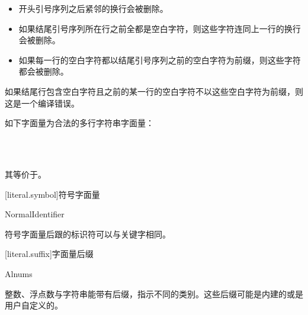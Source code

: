 \begin{itemize}
    \item 开头引号序列之后紧邻的换行会被删除。
    \item 如果结尾引号序列所在行之前全都是空白字符，则这些字符连同上一行的换行会被删除。
    \item 如果每一行的空白字符都以结尾引号序列之前的空白字符为前缀，则这些字符都会被删除。
\end{itemize}

如果结尾行包含空白字符且之前的某一行的空白字符不以这些空白字符为前缀，则这是一个编译错误。

\enterexample

如下字面量为合法的多行字符串字面量：

 \\
 \\

其等价于。

\exitexample

[literal.symbol]{符号字面量}

\begin{bnf}
 \br
     NormalIdentifier
\end{bnf}

符号字面量后跟的标识符可以与关键字相同。

[literal.suffix]{字面量后缀}

\begin{bnf}
 \br
    Alnums
\end{bnf}

整数、浮点数与字符串能带有后缀，指示不同的类别。这些后缀可能是内建的或是用户自定义的。